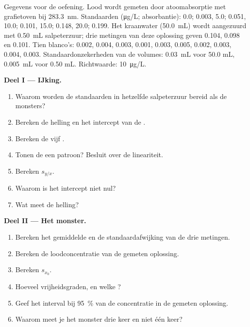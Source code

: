 \begin{problem}
\label{pb:b2:measurement-statistics:1}
Gegevens voor de oefening. Lood wordt gemeten door atoomabsorptie met grafietoven bij \qty{283.3}{nm}. Standaarden
(\unit{\micro g/L}; absorbantie): 0.0; 0.003, 5.0; 0.051, 10.0; 0.101, 15.0; 0.148, 20.0; 0.199. Het
kraanwater (\qty{50.0}{mL}) wordt aangezuurd met \qty{0.50}{mL} salpeterzuur; drie metingen van deze
oplossing geven 0.104, 0.098 en 0.101. Tien blanco's: 0.002, 0.004, 0.003, 0.001, 0.003, 0.005, 0.002,
0.003, 0.004, 0.003. Standaardonzekerheden van de volumes: \qty{0.03}{mL} voor 50.0 mL,
\qty{0.005}{mL} voor 0.50 mL. Richtwaarde: \qty{10}{\micro g/L}.

\medskip
\noindent\textbf{Deel I --- IJking.}
\begin{enumerate}
  \item Waarom worden de standaarden in hetzelfde salpeterzuur bereid als de monsters?
  \item Bereken de helling en het intercept van de .
  \item Bereken de vijf .
  \item Tonen de  een patroon? Besluit over de lineariteit.
  \item Bereken $s_{y/x}$.
  \item Waarom is het intercept niet nul?
  \item Wat meet de helling?
\end{enumerate}

\medskip
\noindent\textbf{Deel II --- Het monster.}
\begin{enumerate}[resume]
  \item Bereken het gemiddelde en de standaardafwijking van de drie metingen.
  \item Bereken de loodconcentratie van de gemeten oplossing.
  \item Bereken $s_{x_0}$.
  \item Hoeveel vrijheidsgraden, en welke ?
  \item Geef het interval bij 95~\% van de concentratie in de gemeten oplossing.
  \item Waarom meet je het monster drie keer en niet één keer?
\end{enumerate}


\end{problem}
